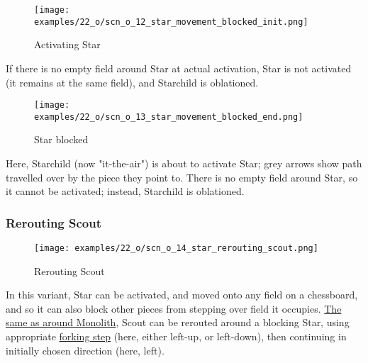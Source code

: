 \noindent
\begin{wrapfigure}[4]{l}{0.4\textwidth}
\centering
\texttt{[image: examples/22\_o/scn\_o\_12\_star\_movement\_blocked\_init.png]}
\caption{Activating Star}
\label{fig:scn_o_12_star_movement_blocked_init}
\end{wrapfigure}
If there is no empty field around Star at actual activation, Star is not activated
(it remains at the same field), and Starchild is oblationed.

\vspace*{4.1\baselineskip}
\noindent
\begin{wrapfigure}[7]{l}{0.4\textwidth}
\centering
\texttt{[image: examples/22\_o/scn\_o\_13\_star\_movement\_blocked\_end.png]}
\caption{Star blocked}
\label{fig:scn_o_13_star_movement_blocked_end}
\end{wrapfigure}
Here, Starchild (now "it-the-air") is about to activate Star; grey arrows show path
travelled over by the piece they point to. There is no empty field around Star, so it
cannot be activated; instead, Starchild is oblationed.

\subsubsection*{Rerouting Scout}
\label{sec:One/Starchild/Movement/Rerouting Scout}

\noindent
\begin{wrapfigure}[8]{l}{0.4\textwidth}
\centering
\texttt{[image: examples/22\_o/scn\_o\_14\_star\_rerouting\_scout.png]}
\caption{Rerouting Scout}
\label{fig:scn_o_14_star_rerouting_scout}
\end{wrapfigure}
In this variant, Star can be activated, and moved onto any field on a chessboard,
and so it can also block other pieces from stepping over field it occupies. \newline
\indent
\hyperref[fig:scn_d_10_monolith_rerouting_scout]{The same as around Monolith},
Scout can be rerouted around a blocking Star, using appropriate
\hyperref[fig:scn_hd_17_scout_forking_steps]{forking step} (here, either left-up,
or left-down), then continuing in initially chosen direction (here, left).

